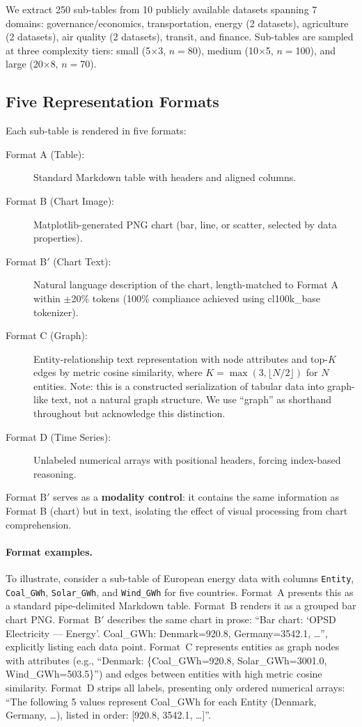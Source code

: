 \documentclass[11pt]{article}
\begin{document}
We extract 250 sub-tables from 10 publicly available datasets spanning 7 domains: governance/economics, transportation, energy (2 datasets), agriculture (2 datasets), air quality (2 datasets), transit, and finance. Sub-tables are sampled at three complexity tiers: small (5$\times$3, $n{=}$80), medium (10$\times$5, $n{=}$100), and large (20$\times$8, $n{=}$70).

\subsection{Five Representation Formats}

Each sub-table is rendered in five formats:

\begin{description}
    \item[Format A (Table):] Standard Markdown table with headers and aligned columns.
    \item[Format B (Chart Image):] Matplotlib-generated PNG chart (bar, line, or scatter, selected by data properties).
    \item[Format B$'$ (Chart Text):] Natural language description of the chart, length-matched to Format A within $\pm$20\% tokens (100\% compliance achieved using cl100k\_base tokenizer).
    \item[Format C (Graph):] Entity-relationship text representation with node attributes and top-$K$ edges by metric cosine similarity, where $K{=}\max(3, \lfloor N/2 \rfloor)$ for $N$ entities. Note: this is a constructed serialization of tabular data into graph-like text, not a natural graph structure. We use ``graph'' as shorthand throughout but acknowledge this distinction.
    \item[Format D (Time Series):] Unlabeled numerical arrays with positional headers, forcing index-based reasoning.
\end{description}

Format B$'$ serves as a \textbf{modality control}: it contains the same information as Format B (chart) but in text, isolating the effect of visual processing from chart comprehension.

\paragraph{Format examples.} To illustrate, consider a sub-table of European energy data with columns \texttt{Entity}, \texttt{Coal\_GWh}, \texttt{Solar\_GWh}, and \texttt{Wind\_GWh} for five countries. Format~A presents this as a standard pipe-delimited Markdown table. Format~B renders it as a grouped bar chart PNG. Format~B$'$ describes the same chart in prose: ``Bar chart: `OPSD Electricity --- Energy'. Coal\_GWh: Denmark=920.8, Germany=3542.1, \ldots'', explicitly listing each data point. Format~C represents entities as graph nodes with attributes (e.g., ``Denmark: \{Coal\_GWh=920.8, Solar\_GWh=3001.0, Wind\_GWh=503.5\}'') and edges between entities with high metric cosine similarity. Format~D strips all labels, presenting only ordered numerical arrays: ``The following 5 values represent Coal\_GWh for each Entity (Denmark, Germany, \ldots), listed in order: [920.8, 3542.1, \ldots]''.
\end{document}
